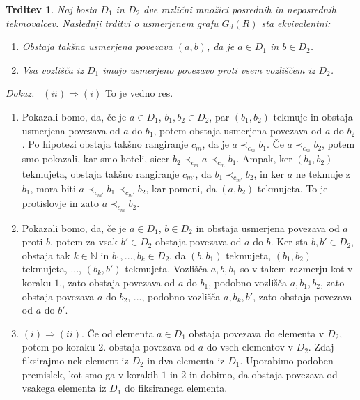 \documentclass[a4paper, 12pt]{book}
\newtheorem{trditev}{Trditev}[chapter]
\newenvironment{dokaz}{\emph{Dokaz.}\ }{\hspace{\fill}{$\Box$}}
\begin{document}
\begin{trditev}
\label{trditev_ekvivalenc_mnozic_posrednih_tekmovalcev}
    Naj bosta $D_1$ in $D_2$ dve različni množici posrednih in neposrednih tekmovalcev. Naslednji trditvi o usmerjenem grafu $G_d(R)$ sta ekvivalentni:
    \begin{enumerate}[label=(\roman*)]
        \item Obstaja takšna usmerjena povezava $(a, b)$, da je $a \in D_1$ in $b \in D_2$.
        \item Vsa vozlišča iz $D_1$ imajo usmerjeno povezavo proti vsem vozliščem iz $D_2$.
    \end{enumerate}
\end{trditev}
\begin{dokaz}
    $(ii) \Rightarrow (i)$ To je vedno res.

    \begin{enumerate}
        \item Pokazali bomo, da, če je $a \in D_1$, $b_1, b_2 \in D_2$, par $(b_1, b_2)$ tekmuje in obstaja usmerjena povezava od $a$ do $b_1$, potem obstaja usmerjena povezava od $a$ do $b_2$. Po hipotezi obstaja takšno rangiranje $c_m$, da je $a \prec_{c_m} b_1$. Če $a \prec_{c_m} b_2$, potem smo pokazali, kar smo hoteli, sicer $b_2 \prec_{c_m} a \prec_{c_m} b_1$. Ampak, ker $(b_1, b_2)$ tekmujeta, obstaja takšno rangiranje $c_{m'}$, da $b_1 \prec_{c_{m'}} b_2$, in ker $a$ ne tekmuje z $b_1$, mora biti $a \prec_{c_{m'}} b_1 \prec_{c_{m'}} b_2$, kar pomeni, da $(a, b_2)$ tekmujeta. To je protislovje in zato $a \prec_{c_m} b_2$.
        \item Pokazali bomo, da, če je $a \in D_1$, $b \in D_2$ in obstaja usmerjena povezava od $a$ proti $b$, potem za vsak $b' \in D_2$ obstaja povezava od $a$ do $b$. Ker sta $b, b' \in D_2$, obstaja tak $k \in \mathbb{N}$ in $b_1, ..., b_k \in D_2$, da $(b, b_1)$ tekmujeta, $(b_1, b_2)$ tekmujeta, ..., $(b_k, b')$ tekmujeta. Vozlišča $a, b, b_1$ so v takem razmerju kot v koraku $1.$, zato obstaja povezava od $a$ do $b_1$, podobno vozlišča $a, b_1, b_2$, zato obstaja povezava $a$ do $b_2$, ..., podobno vozlišča $a, b_k, b'$, zato obstaja povezava od $a$ do $b'$.
        \item $(i) \Rightarrow (ii)$. Če od elementa $a \in D_1$ obstaja povezava do elementa v $D_2$, potem po koraku $2.$ obstaja povezava od $a$ do vseh elementov v $D_2$. Zdaj fiksirajmo nek element iz $D_2$ in dva elementa iz $D_1$. Uporabimo podoben premislek, kot smo ga v korakih $1$ in $2$ in dobimo, da obstaja povezava od vsakega elementa iz $D_1$ do fiksiranega elementa.
    \end{enumerate}
\end{dokaz}
\end{document}
